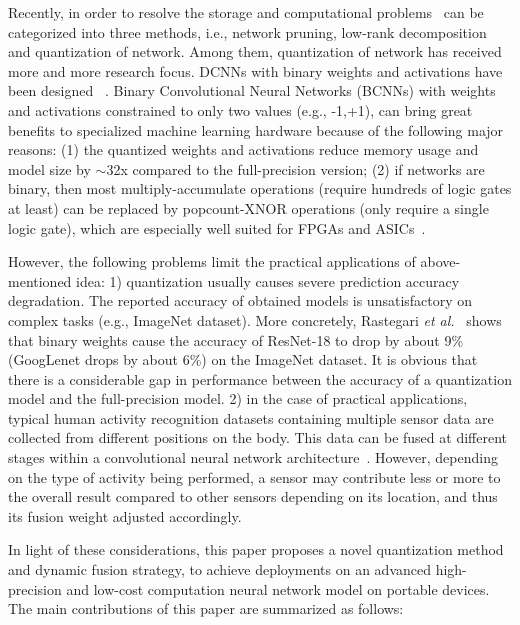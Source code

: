 \documentclass[twoside,twocolumn]{article}
\begin{document}
Recently, in order to resolve the storage and computational problems~\cite{b13,b14} can be categorized into three methods, i.e., network pruning, low-rank decomposition and quantization of network. Among them, quantization of network has received more and more research focus. DCNNs with binary weights and activations have been designed ~\cite{b15,b16,b17}. Binary Convolutional Neural Networks (BCNNs) with weights and activations constrained to only two values (e.g., -1,+1), can bring great benefits to specialized machine learning hardware because of the following major reasons: (1) the quantized weights and activations reduce memory usage and model size by $\sim$32x compared to the full-precision version; (2) if networks are binary, then most multiply-accumulate operations (require hundreds of logic gates at least) can be replaced by popcount-XNOR operations (only require a single logic gate), which are especially well suited for FPGAs and ASICs~\cite{b18}.

However, the following problems limit the practical applications of above-mentioned idea: 1) quantization usually causes severe prediction accuracy degradation. The reported accuracy of obtained models is unsatisfactory on complex tasks (e.g., ImageNet dataset). More concretely, Rastegari \emph{et al.}~\cite{b17} shows that binary weights cause the accuracy of ResNet-18 to drop by about 9\% (GoogLenet drops by about 6\%) on the ImageNet dataset. It is obvious that there is a considerable gap in performance between the accuracy of a quantization model and the full-precision model. 2) in the case of practical applications, typical human activity recognition datasets containing multiple sensor data are collected from different positions on the body. This data can be fused at different stages within a convolutional neural network architecture~\cite{b19}. However, depending on the type of activity being performed, a sensor may contribute less or more to the overall result compared to other sensors depending on its location, and thus its fusion weight adjusted accordingly.

In light of these considerations, this paper proposes a novel quantization method and dynamic fusion strategy, to achieve deployments on an advanced high-precision and low-cost computation neural network model on portable devices. The main contributions of this paper are summarized as follows:
\end{document}
